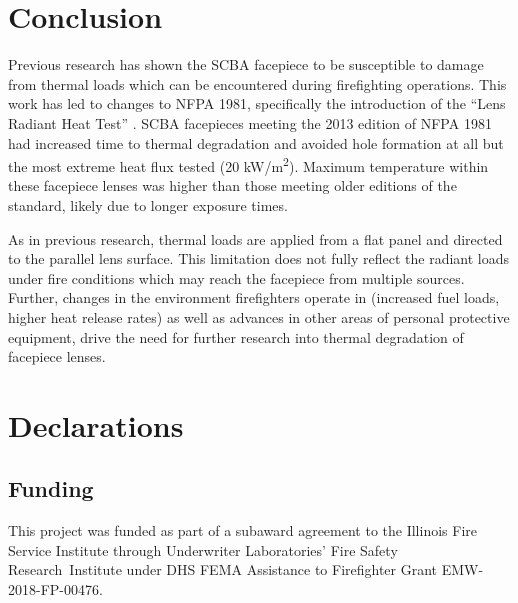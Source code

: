 \documentclass[sn-mathphys]{sn-jnl}%
\theoremstyle{thmstyleone}%
\theoremstyle{thmstyletwo}%
\theoremstyle{thmstylethree}%
\begin{document}
\section{Conclusion}
Previous research has shown the SCBA facepiece to be susceptible to damage from thermal loads which can be encountered during firefighting operations. This work has led to changes to NFPA 1981, specifically the introduction of the “Lens Radiant Heat Test” \cite{national_fire_protection_association_nfpa_2013}. SCBA facepieces meeting the 2013 edition of NFPA 1981 had increased time to thermal degradation and avoided hole formation at all but the most extreme heat flux tested (20 kW/m\textsuperscript{2}). Maximum temperature within these facepiece lenses was higher than those meeting older editions of the standard, likely due to longer exposure times. 

As in previous research, thermal loads are applied from a flat panel and directed to the parallel lens surface. This limitation does not fully reflect the radiant loads under fire conditions which may reach the facepiece from multiple sources. Further, changes in the environment firefighters operate in (increased fuel loads, higher heat release rates) as well as advances in other areas of personal protective equipment, drive the need for further research into thermal degradation of facepiece lenses. 


\section*{Declarations}
\subsection*{Funding}

This project was funded as part of a subaward agreement to the \mbox{Illinois} Fire Service Institute through Underwriter Laboratories’ Fire Safety \mbox{Research Institute} under DHS FEMA Assistance to Firefighter Grant \mbox{EMW-2018-FP-00476}. 


\end{document}

